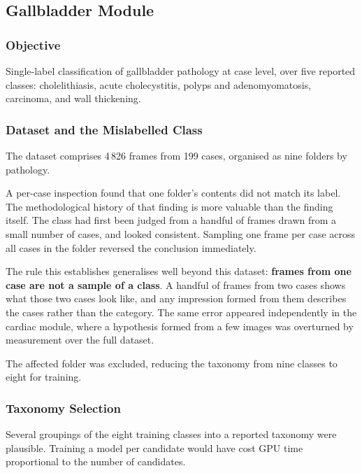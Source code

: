 \subsection{Gallbladder Module}
\label{subsec:gallbladder-module}

\subsubsection{Objective}

Single-label classification of gallbladder pathology at case level, over five reported classes:
cholelithiasis, acute cholecystitis, polyps and adenomyomatosis, carcinoma, and wall thickening.

\subsubsection{Dataset and the Mislabelled Class}

The dataset comprises 4\,826 frames from 199 cases, organised as nine folders by pathology.

A per-case inspection found that one folder's contents did not match its label. The
methodological history of that finding is more valuable than the finding itself. The class had
first been judged from a handful of frames drawn from a small number of cases, and looked
consistent. Sampling one frame per case across all cases in the folder reversed the conclusion
immediately.

The rule this establishes generalises well beyond this dataset: \textbf{frames from one case are
not a sample of a class}. A handful of frames from two cases shows what those two cases look
like, and any impression formed from them describes the cases rather than the category. The same
error appeared independently in the cardiac module, where a hypothesis formed from a few images
was overturned by measurement over the full dataset.

The affected folder was excluded, reducing the taxonomy from nine classes to eight for training.

\subsubsection{Taxonomy Selection}

Several groupings of the eight training classes into a reported taxonomy were plausible. Training
a model per candidate would have cost GPU time proportional to the number of candidates.

